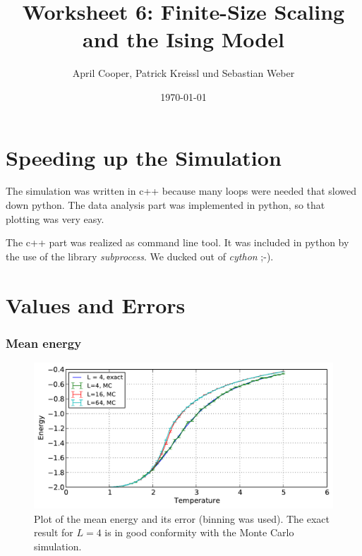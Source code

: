 \documentclass[12pt,a4paper]{scrartcl}
\author{April Cooper, Patrick Kreissl und Sebastian Weber}
\title{Worksheet 6: Finite-Size Scaling and the Ising Model}
\date{\today}
\begin{document}
\maketitle
\tableofcontents
\newpage

\section{Speeding up the Simulation}
The simulation was written in c++ because many loops were needed that slowed down python. The data analysis part was implemented in python, so that plotting was very easy.

The c++ part was realized as command line tool. It was included in python by the use of the library \textit{subprocess}. We ducked out of \textit{cython} ;-).

\section{Values and Errors}

\subsubsection*{Mean energy}
\begin{figure}[H]
\includegraphics[width=13.0cm]{../plots/1simulation_01.pdf}
\caption{Plot of the mean energy and its error (binning was used). The exact result for $L=4$ is in good conformity with the Monte Carlo simulation.}
\end{figure}
\end{document}
